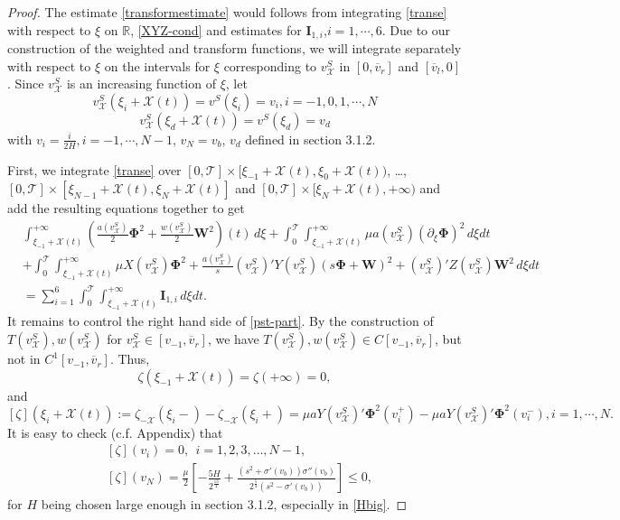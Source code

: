 \documentclass[12pt,reqno]{amsart}
\numberwithin{equation}{section}
\def\p{\partial}
\def\T{\mathcal{T}}
\def\ph{\mathbf{\Phi}}
\def\w{\mathbf{W}}
\def\vsx{v^S_{\mathcal{X}}}
\def\avl{\overline{v}_l}
\def\avr{\overline{v}_r}
\def\X{\mathcal{X}}
\begin{document}
\begin{proof}
	The estimate \eqref{transformestimate} would follows from integrating \eqref{transe} with respect to $\xi$ on $\mathbb{R}$, \eqref{XYZ-cond} and estimates for $\textbf{I}_{1,i}$,$i=1,\cdots,6$. Due to our construction of the weighted and transform functions, we will integrate separately with respect to $\xi$ on the intervals for $\xi$ corresponding to $\vsx$ in $[0,\avr]$ and $[\avl,0]$. Since $\vsx$ is an increasing function of $\xi$, let
	$$\vsx(\xi_i+\X(t))=v^S(\xi_i)=v_i, i=-1,0,1,\cdots,N$$
	$$\vsx(\xi_d+\X(t))=v^S(\xi_d)=v_d$$
	with $v_i=\frac{i}{2H},i=-1,\cdots, N-1$, $v_N=v_b$, $v_d$ defined in section 3.1.2.  
	
	First, we integrate \eqref{transe} over $[0,\T]\times[\xi_{-1}+\X(t),\xi_0+\X(t))$,  \dots, $[0,\T]\times[\xi_{N-1}+\X(t),\xi_N+\X(t)]$ and 
	$[0,\T]\times[\xi_N+\X(t),+\infty)$ and add the resulting equations together to get
\begin{equation}\label{pst-part}
	\begin{aligned}
		&\int_{\xi_{-1}+\X(t)}^{+\infty}\left(\frac{a(\vsx)}{2}\ph^2+\frac{w(\vsx)}{2}\w^2\right)(t)\,d\xi+\int_{0}^{\T}\int_{\xi_{-1}+\X(t)}^{+\infty}\mu a(\vsx)(\p_{\xi}\ph)^2\,d\xi dt\\
		&+\int_{0}^{\T}\int_{\xi_{-1}+\X(t)}^{+\infty}\mu X(\vsx)\ph^2+\frac{a(\vsx)}{s}(\vsx)'Y(\vsx)(s\ph+\w)^2+(\vsx)'Z(\vsx)\w^2\,d\xi dt\\
		&=\sum_{i=1}^{6}\int_{0}^{\T}\int_{\xi_{-1}+\X(t)}^{+\infty}\textbf{I}_{1,i}\,d\xi dt.
	\end{aligned}
\end{equation}
	It remains to control the right hand side of \eqref{pst-part}. By the construction of $T(\vsx),w(\vsx)$ for $\vsx\in[v_{-1},\avr]$, we have $T(\vsx),w(\vsx) \in C[v_{-1},\avr]$,
	but not in $C^1[v_{-1},\avr]$.  Thus,
	$$\zeta(\xi_{-1}+\X(t))=\zeta(+\infty)=0,$$
	and
	$$[\zeta](\xi_i+\X(t)):=\zeta_{-\X}(\xi_i-)-\zeta_{-\X}(\xi_i+)=\mu aY(\vsx)'\ph^2(v_i^+)-\mu aY(\vsx)'\ph^2(v_i^-),i=1,\cdots, N.$$
	It is easy to check (c.f. Appendix) that
	\begin{equation}\label{interact}
		\begin{aligned}
			&[\zeta](v_i)=0,~~i=1,2,3,\dots,N-1,\\
			&[\zeta](v_N)=\frac{\mu}{2}[-\frac{5H}{2^{\frac{13}{4}}}+\frac{(s^2+\sigma'(v_b))\sigma''(v_b)}{2^{\frac{5}{4}}(s^2-\sigma'(v_b))}]\leq 0,
		\end{aligned}
	\end{equation}
	for $H$ being chosen large enough in section 3.1.2, especially in \eqref{Hbig}. 

\end{proof}
\end{document}
